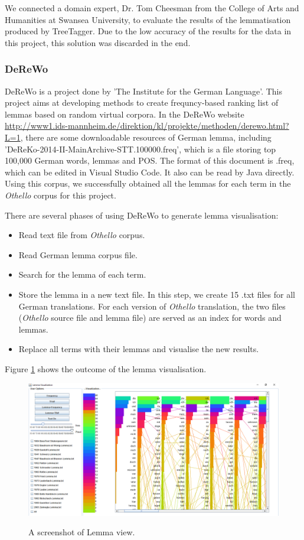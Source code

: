 We connected a domain expert, Dr. Tom Cheesman from the College of Arts and Humanities at Swansea University, to evaluate the results of the lemmatisation produced by TreeTagger. Due to the low accuracy of the results for the data in this project, this solution was discarded in the end.

\subsubsection{DeReWo}

DeReWo is a project done by 'The Institute for the German Language'. This project aims at developing methods to create frequncy-based ranking list of lemmas based on random virtual corpora. In the DeReWo website \url{http://www1.ids-mannheim.de/direktion/kl/projekte/methoden/derewo.html?L=1}, there are some downloadable resources of German lemma, including 'DeReKo-2014-II-MainArchive-STT.100000.freq', which is a file storing top 100,000 German words, lemmas and POS. The format of this document is .freq, which can be edited in Visual Studio Code. It also can be read by Java directly. Using this corpus, we successfully obtained all the lemmas for each term in the \emph{Othello} corpus for this project.

There are several phases of using DeReWo to generate lemma visualisation:
\begin{itemize}
	\item \textbf{} Read text file from \emph{Othello} corpus.	
	\item \textbf{} Read German lemma corpus file.
	\item \textbf{} Search for the lemma of each term.
	\item \textbf{} Store the lemma in a new text file. In this step, we create 15 .txt files for all German translations. For each version of \emph{Othello} translation, the two files (\emph{Othello} source file and lemma file) are served as an index for words and lemmas.
	\item \textbf{} Replace all terms with their lemmas and visualise the new results.
\end{itemize}	

Figure \ref{fig:lemmaView} shows the outcome of the lemma visualisation. 

\begin{figure}[H]
	\centering	
	\includegraphics[width=\textwidth]{Figs/LemmaView}\\[1ex]
	\caption{A screenshot of Lemma view.}
	\label{fig:lemmaView}
\end{figure} 

